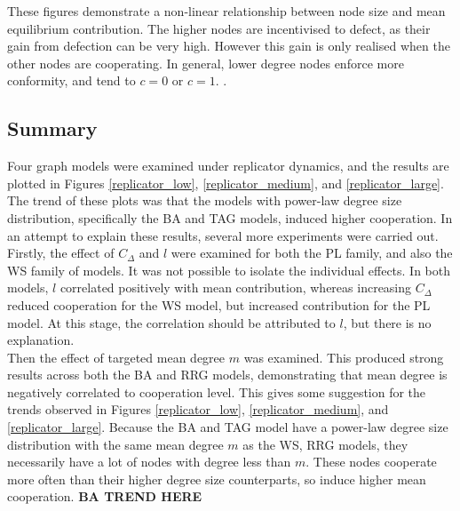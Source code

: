 These figures demonstrate a non-linear relationship between node size and mean equilibrium contribution. The higher nodes are incentivised to defect, as their gain from defection can be very high. However this gain is only realised when the other nodes are cooperating. In general, lower degree nodes enforce more conformity, and tend to $c=0$ or $c=1$. . \\

\subsection{Summary}
Four graph models were examined under replicator dynamics, and the results are plotted in Figures \ref{replicator_low}, \ref{replicator_medium}, and \ref{replicator_large}. The trend of these plots was that the models with power-law degree size distribution, specifically the BA and TAG models, induced higher cooperation. In an attempt to explain these results, several more experiments were carried out. \\

Firstly, the effect of $C_\Delta$ and $l$ were examined for both the PL family, and also the WS family of models. It was not possible to isolate the individual effects. In both models, $l$ correlated positively with mean contribution, whereas increasing $C_\Delta$ reduced cooperation for the WS model, but increased contribution for the PL model. At this stage, the correlation should be attributed to $l$, but there is no explanation. \\

Then the effect of targeted mean degree $m$ was examined. This produced strong results across both the BA and RRG models, demonstrating that mean degree is negatively correlated to cooperation level. This gives some suggestion for the trends observed in Figures \ref{replicator_low}, \ref{replicator_medium}, and \ref{replicator_large}. Because the BA and TAG model have a power-law degree size distribution with the same mean degree $m$ as the WS, RRG models, they necessarily have a lot of nodes with degree less than $m$. These nodes cooperate more often than their higher degree size counterparts, so induce higher mean cooperation. \textbf{BA TREND HERE} 


